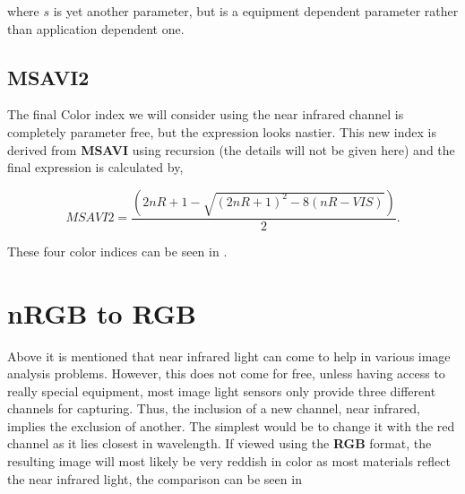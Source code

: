 where $s$ is yet another parameter, but is a equipment dependent parameter rather than application dependent one.


\subsection{MSAVI2}

The final Color index we will consider using the near infrared channel is completely parameter free, but the expression looks nastier. This new index is derived from \textbf{MSAVI} using recursion (the details will not be given here) and the final expression is calculated by,

\begin{equation}
    MSAVI2 = \frac{\left(2nR+1-\sqrt{\left(2nR+1\right)^2-8\left(nR-VIS\right)}\right)}{2}.
\end{equation}


These four color indices can be seen in .

\section{nRGB to RGB}

Above it is mentioned that near infrared light can come to help in various image analysis problems. However, this does not come for free, unless having access to really special equipment, most image light sensors only provide three different channels for capturing. Thus, the inclusion of a new channel, near infrared, implies the exclusion of another. The simplest would be to change it with the red channel as it lies closest in wavelength. If viewed using the \textbf{RGB} format, the resulting image will most likely be very reddish in color as most materials reflect the near infrared light, the comparison can be seen in 


